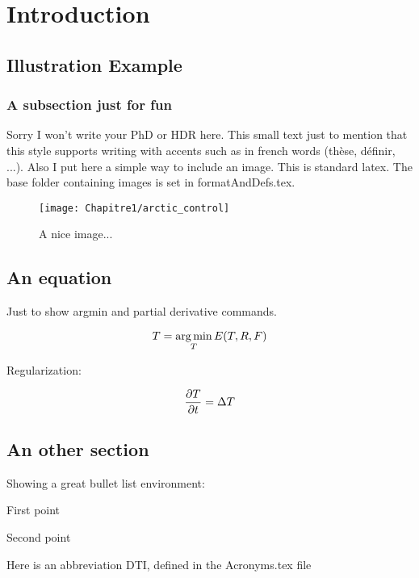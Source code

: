 
\chapter{Introduction}
\label{chap:intro}
\minitoc

\section{Illustration Example}

\subsection{A subsection just for fun}

Sorry I won't write your PhD or HDR here. This small text just to mention that this style supports writing with accents such as in french words (thèse, définir, ...). Also I put here a simple way to include an image. This is standard latex. The base folder containing images is set in formatAndDefs.tex.

\begin{figure}[!htbp]
  \begin{center}
    \texttt{[image: Chapitre1/arctic\_control]}
  \end{center}
  \caption{A nice image...}
  \label{fig:jolieImage}
\end{figure}

\section{An equation}

Just to show argmin and partial derivative commands.

\begin{equation}
  T = \argmin_T E(T,R,F)
\end{equation}

Regularization:

\begin{equation}
  \frac{\partial T}{\partial t} = \Delta T
\end{equation}

\section{An other section}

Showing a great bullet list environment:

\begin{bulletList}
 \item First point
 \item Second point
\item Here is an abbreviation \ac{DTI}, defined in the Acronyms.tex file
\end{bulletList}
